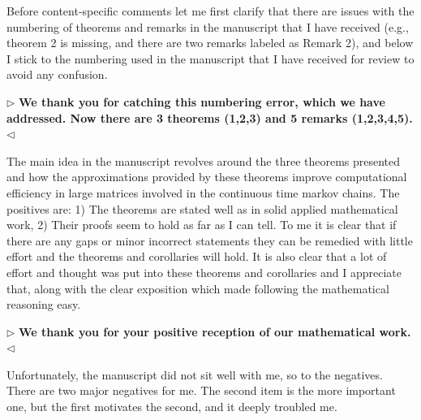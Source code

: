 \documentclass[12pt]{article}
\newenvironment{reply}{$\triangleright$\bfseries}{$\triangleleft$}
\begin{document}
Before content-specific comments let me first clarify that there are issues with the numbering of theorems and remarks in the manuscript that I have received (e.g., theorem 2 is missing, and there are two remarks labeled as Remark 2), and below I stick to the numbering used in the manuscript that I have received for review to avoid any confusion. 

\begin{reply}
	We thank you for catching this numbering error, which we have addressed.  Now there are 3 theorems (1,2,3) and 5 remarks (1,2,3,4,5).
\end{reply}

The main idea in the manuscript revolves around the three theorems presented and how the approximations provided by these theorems improve computational efficiency in large matrices involved in the continuous time markov chains. The positives are: 1) The theorems are stated well as in solid applied mathematical work, 2) Their proofs seem to hold as far as I can tell. 
To me it is clear that if there are any gaps or minor incorrect statements they can be remedied with little effort and the theorems and corollaries will hold. It is also clear that a lot of effort and thought was put into these theorems and corollaries and I appreciate that, along with the clear exposition which made following the mathematical reasoning easy. 

\begin{reply}
	We thank you for your positive reception of our mathematical work.
\end{reply}

Unfortunately, the manuscript did not sit well with me, so to the negatives. There are two major negatives for me. The second item is the more important one, but the first motivates the second, and it deeply troubled me. 
\end{document}
